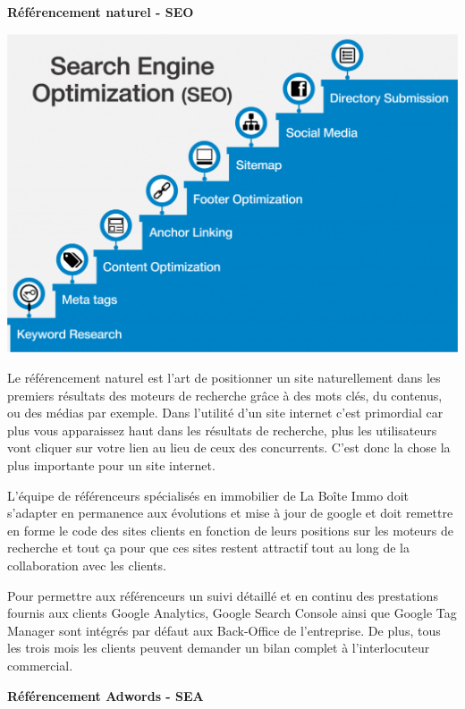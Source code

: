 \documentclass[12pt]{article}
\begin{document}
\medbreak

\textbf{Référencement naturel - SEO}


\vspace{0.5cm}

\begin{center} \includegraphics[scale = 0.2]{SEO.png} \end{center}
\vspace{0.5cm}
Le référencement naturel est l’art de positionner un site naturellement dans les premiers résultats des moteurs de recherche grâce à des mots clés, du contenus, ou des médias par exemple. Dans l'utilité d'un site internet c'est primordial car plus vous apparaissez haut dans les résultats de recherche, plus les utilisateurs vont cliquer sur votre lien au lieu de ceux des concurrents.
C'est donc la chose la plus importante pour un site internet.

L'équipe de référenceurs spécialisés en immobilier de La Boîte Immo doit s'adapter en permanence aux évolutions et mise à jour de google et doit remettre en forme le code des sites clients en fonction de leurs positions sur les moteurs de recherche et tout ça pour que ces sites restent attractif tout au long de la collaboration avec les clients.

Pour permettre aux référenceurs un suivi détaillé et en continu  des prestations fournis aux clients Google Analytics, Google Search Console ainsi que Google Tag Manager sont intégrés par défaut aux Back-Office de l'entreprise. De plus, tous les trois mois les clients peuvent demander un bilan complet à l'interlocuteur commercial.

\medbreak
\textbf{Référencement Adwords - SEA}
\end{document}
